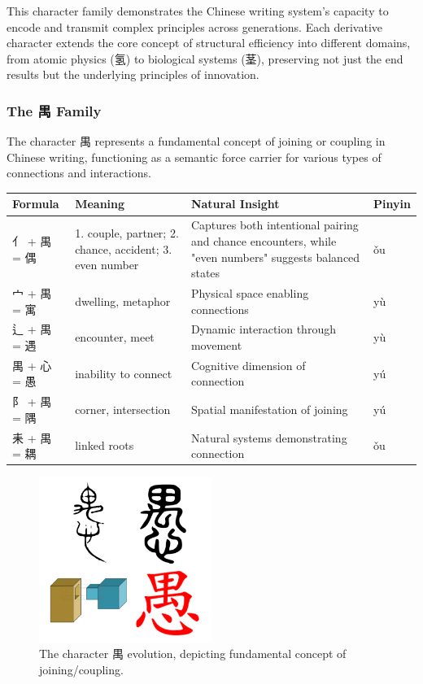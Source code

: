 \documentclass[11pt,letterpaper]{article}
\begin{document}
This character family demonstrates the Chinese writing system's capacity
to encode and transmit complex principles across generations. Each
derivative character extends the core concept of structural efficiency
into different domains, from atomic physics (氢) to biological systems
(茎), preserving not just the end results but the underlying principles
of innovation.

\subsubsection{The 禺 Family}\label{the-ux79ba-family}

The character 禺 represents a fundamental concept of joining or coupling
in Chinese writing, functioning as a semantic force carrier for various
types of connections and interactions.

\begin{longtable}{|p{3cm}|p{3cm}|p{6cm}|p{2cm}|}
\hline
\textbf{Formula} & \textbf{Meaning} & \textbf{Natural Insight} & \textbf{Pinyin} \\
\hline
亻 + 禺 = 偶 & 1. couple, partner; 2. chance, accident; 3. even number &
Captures both intentional pairing and chance encounters, while "even
numbers" suggests balanced states & ǒu \\
\hline
宀 + 禺 = 寓 & dwelling, metaphor & Physical space enabling connections & yù \\
\hline
辶 + 禺 = 遇 & encounter, meet & Dynamic interaction through movement & yù \\
\hline
禺 + 心 = 愚 & inability to connect & Cognitive dimension of connection & yú \\
\hline
阝 + 禺 = 隅 & corner, intersection & Spatial manifestation of joining & yú \\
\hline
耒 + 禺 = 耦 & linked roots & Natural systems demonstrating connection & ǒu \\
\hline
\end{longtable}

\begin{figure}
\centering
\includegraphics[width=0.5\textwidth]{./images/zi_join.png}
\caption{The character 禺 evolution, depicting fundamental concept of
joining/coupling.}
\end{figure}
\end{document}

